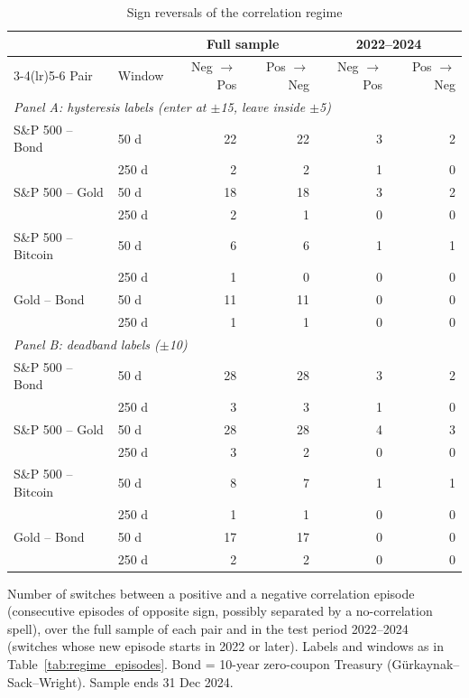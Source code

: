 \begin{table}[t]
\centering
\scriptsize
\caption{Sign reversals of the correlation regime}
\label{tab:regime_reversals}
\begin{tabular}{llrrrr}
\toprule
 & & \multicolumn{2}{c}{Full sample} & \multicolumn{2}{c}{2022--2024} \\
\cmidrule(lr){3-4}\cmidrule(lr){5-6}
Pair & Window & Neg $\to$ Pos & Pos $\to$ Neg & Neg $\to$ Pos & Pos $\to$ Neg \\
\midrule
\multicolumn{6}{l}{\textit{Panel A: hysteresis labels (enter at $\pm$15, leave inside $\pm$5)}} \\
\addlinespace[2pt]
S\&P 500 -- Bond & 50 d & 22 & 22 & 3 & 2 \\
 & 250 d & 2 & 2 & 1 & 0 \\
S\&P 500 -- Gold & 50 d & 18 & 18 & 3 & 2 \\
 & 250 d & 2 & 1 & 0 & 0 \\
S\&P 500 -- Bitcoin & 50 d & 6 & 6 & 1 & 1 \\
 & 250 d & 1 & 0 & 0 & 0 \\
Gold -- Bond & 50 d & 11 & 11 & 0 & 0 \\
 & 250 d & 1 & 1 & 0 & 0 \\
\midrule
\multicolumn{6}{l}{\textit{Panel B: deadband labels ($\pm$10)}} \\
\addlinespace[2pt]
S\&P 500 -- Bond & 50 d & 28 & 28 & 3 & 2 \\
 & 250 d & 3 & 3 & 1 & 0 \\
S\&P 500 -- Gold & 50 d & 28 & 28 & 4 & 3 \\
 & 250 d & 3 & 2 & 0 & 0 \\
S\&P 500 -- Bitcoin & 50 d & 8 & 7 & 1 & 1 \\
 & 250 d & 1 & 1 & 0 & 0 \\
Gold -- Bond & 50 d & 17 & 17 & 0 & 0 \\
 & 250 d & 2 & 2 & 0 & 0 \\
\bottomrule
\end{tabular}
\par\smallskip
\parbox{\linewidth}{\footnotesize Number of switches between a positive and a negative correlation episode (consecutive episodes of opposite sign, possibly separated by a no-correlation spell), over the full sample of each pair and in the test period 2022--2024 (switches whose new episode starts in 2022 or later). Labels and windows as in Table~\ref{tab:regime_episodes}. Bond = 10-year zero-coupon Treasury (G\"urkaynak--Sack--Wright). Sample ends 31 Dec 2024.}
\end{table}
